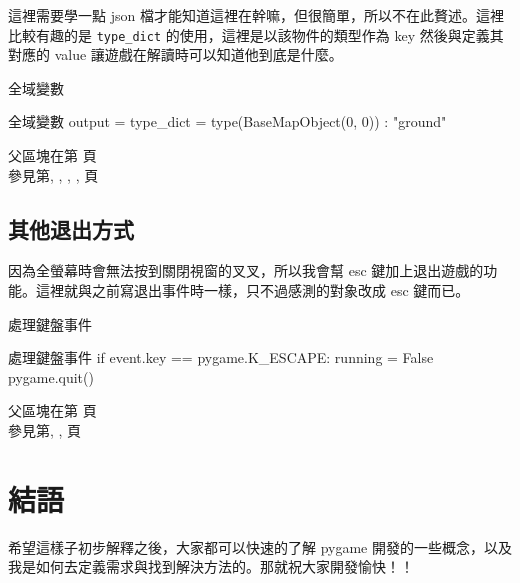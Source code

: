 \documentclass[12pt, a4paper]{siweb}
\begin{document}
這裡需要學一點 json 檔才能知道這裡在幹嘛，但很簡單，所以不在此贅述。這裡比較有趣的是 \verb|type_dict| 的使用，這裡是以該物件的類型作為 key 然後與定義其對應的 value 讓遊戲在解讀時可以知道他到底是什麼。

\begin{siweb}{全域變數}
\begin{mylisting}{全域變數}
output = {}
type_dict = {
	type(BaseMapObject(0, 0)) : "ground"
}
\end{mylisting}
\label{全域變數_3}
父區塊在第\pageref{全域變數_father} 頁\\參見第\pageref{全域變數_0}, \pageref{全域變數_1}, \pageref{全域變數_2}, \pageref{全域變數_3}, 頁
\end{siweb}

\subsection{其他退出方式}

因為全螢幕時會無法按到關閉視窗的叉叉，所以我會幫 esc 鍵加上退出遊戲的功能。這裡就與之前寫退出事件時一樣，只不過感測的對象改成 esc 鍵而已。

\begin{siweb}{處理鍵盤事件}
\begin{mylisting}{處理鍵盤事件}
	if event.key == pygame.K_ESCAPE:
		running = False
		pygame.quit()
\end{mylisting}
\label{處理鍵盤事件_1}
父區塊在第\pageref{處理鍵盤事件_father} 頁\\參見第\pageref{處理鍵盤事件_0}, \pageref{處理鍵盤事件_1}, 頁
\end{siweb}

\section{結語}

希望這樣子初步解釋之後，大家都可以快速的了解 pygame 開發的一些概念，以及我是如何去定義需求與找到解決方法的。那就祝大家開發愉快！！
\end{document}
